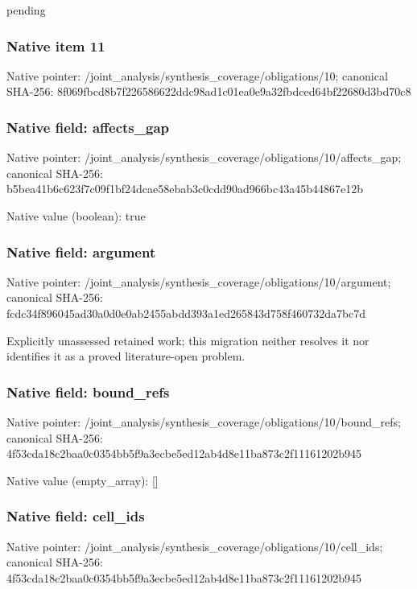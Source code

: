 \documentclass[10pt,a4paper]{article}
\begin{document}
\begingroup\raggedright\sloppy pending\par\endgroup

\subsubsection{Native item 11}
Native pointer: /joint\_\allowbreak{}analysis/synthesis\_\allowbreak{}coverage/obligations/10; canonical SHA-256: 8f069fbcd8b7f226586622ddc98ad1c01ea0e9a32fbdced64bf22680d3bd70c8

\subsubsection{Native field: affects\_\allowbreak{}gap}
Native pointer: /joint\_\allowbreak{}analysis/synthesis\_\allowbreak{}coverage/obligations/10/affects\_\allowbreak{}gap; canonical SHA-256: b5bea41b6c623f7c09f1bf24dcae58ebab3c0cdd90ad966bc43a45b44867e12b

Native value (boolean): true

\subsubsection{Native field: argument}
Native pointer: /joint\_\allowbreak{}analysis/synthesis\_\allowbreak{}coverage/obligations/10/argument; canonical SHA-256: fcdc34f896045ad30a0d0e0ab2455abdd393a1ed265843d758f460732da7bc7d

\begingroup\raggedright\sloppy Explicitly unassessed retained work;\allowbreak{} this migration neither resolves it nor identifies it as a proved literature-open problem.\par\endgroup

\subsubsection{Native field: bound\_\allowbreak{}refs}
Native pointer: /joint\_\allowbreak{}analysis/synthesis\_\allowbreak{}coverage/obligations/10/bound\_\allowbreak{}refs; canonical SHA-256: 4f53cda18c2baa0c0354bb5f9a3ecbe5ed12ab4d8e11ba873c2f11161202b945

Native value (empty\_\allowbreak{}array): []

\subsubsection{Native field: cell\_\allowbreak{}ids}
Native pointer: /joint\_\allowbreak{}analysis/synthesis\_\allowbreak{}coverage/obligations/10/cell\_\allowbreak{}ids; canonical SHA-256: 4f53cda18c2baa0c0354bb5f9a3ecbe5ed12ab4d8e11ba873c2f11161202b945
\end{document}
